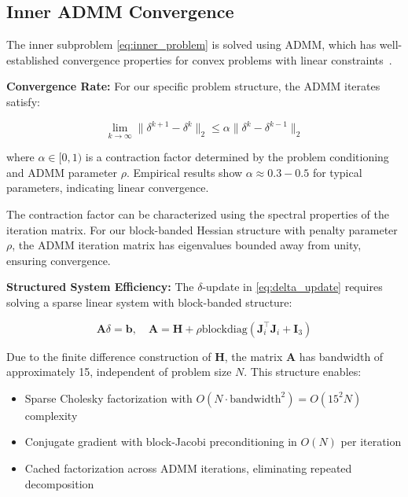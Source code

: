 \subsection{Inner ADMM Convergence}

The inner subproblem \eqref{eq:inner_problem} is solved using ADMM, which has well-established convergence properties for convex problems with linear constraints~\cite{admm}.

\textbf{Convergence Rate:} For our specific problem structure, the ADMM iterates satisfy:

\begin{equation}
\lim_{k \to \infty} \|\delta^{k+1} - \delta^k\|_2 \leq \alpha \|\delta^k - \delta^{k-1}\|_2
\end{equation}

where $\alpha \in [0,1)$ is a contraction factor determined by the problem conditioning and ADMM parameter $\rho$. Empirical results show $\alpha \approx 0.3-0.5$ for typical parameters, indicating linear convergence.

The contraction factor can be characterized using the spectral properties of the iteration matrix. For our block-banded Hessian structure with penalty parameter $\rho$, the ADMM iteration matrix has eigenvalues bounded away from unity, ensuring convergence.

\textbf{Structured System Efficiency:} The $\delta$-update in \eqref{eq:delta_update} requires solving a sparse linear system with block-banded structure:

\begin{equation}
\mathbf{A}\delta = \mathbf{b}, \quad \mathbf{A} = \mathbf{H} + \rho \text{blockdiag}(\mathbf{J}_i^{\top} \mathbf{J}_i + \mathbf{I}_3)
\end{equation}

Due to the finite difference construction of $\mathbf{H}$, the matrix $\mathbf{A}$ has bandwidth of approximately 15, independent of problem size $N$. This structure enables:

\begin{itemize}
\item Sparse Cholesky factorization with $O(N \cdot \text{bandwidth}^2) = O(15^2 N)$ complexity
\item Conjugate gradient with block-Jacobi preconditioning in $O(N)$ per iteration
\item Cached factorization across ADMM iterations, eliminating repeated decomposition
\end{itemize}


